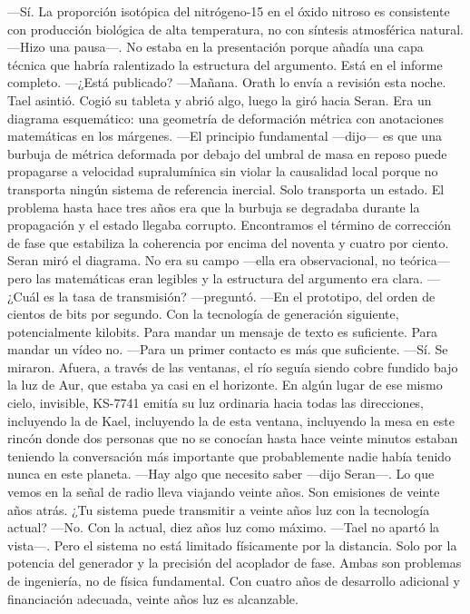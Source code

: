 \documentclass[11pt,a5paper,twoside]{book}
\begin{document}
—Sí. La proporción isotópica del nitrógeno-15 en el óxido nitroso es consistente con producción biológica de alta temperatura, no con síntesis atmosférica natural. —Hizo una pausa—. No estaba en la presentación porque añadía una capa técnica que habría ralentizado la estructura del argumento. Está en el informe completo.
—¿Está publicado?
—Mañana. Orath lo envía a revisión esta noche.
Tael asintió. Cogió su tableta y abrió algo, luego la giró hacia Seran. Era un diagrama esquemático: una geometría de deformación métrica con anotaciones matemáticas en los márgenes.
—El principio fundamental —dijo— es que una burbuja de métrica deformada por debajo del umbral de masa en reposo puede propagarse a velocidad supralumínica sin violar la causalidad local porque no transporta ningún sistema de referencia inercial. Solo transporta un estado. El problema hasta hace tres años era que la burbuja se degradaba durante la propagación y el estado llegaba corrupto. Encontramos el término de corrección de fase que estabiliza la coherencia por encima del noventa y cuatro por ciento.
Seran miró el diagrama. No era su campo —ella era observacional, no teórica— pero las matemáticas eran legibles y la estructura del argumento era clara.
—¿Cuál es la tasa de transmisión? —preguntó.
—En el prototipo, del orden de cientos de bits por segundo. Con la tecnología de generación siguiente, potencialmente kilobits. Para mandar un mensaje de texto es suficiente. Para mandar un vídeo no.
—Para un primer contacto es más que suficiente.
—Sí.
Se miraron.
Afuera, a través de las ventanas, el río seguía siendo cobre fundido bajo la luz de Aur, que estaba ya casi en el horizonte. En algún lugar de ese mismo cielo, invisible, KS-7741 emitía su luz ordinaria hacia todas las direcciones, incluyendo la de Kael, incluyendo la de esta ventana, incluyendo la mesa en este rincón donde dos personas que no se conocían hasta hace veinte minutos estaban teniendo la conversación más importante que probablemente nadie había tenido nunca en este planeta.
—Hay algo que necesito saber —dijo Seran—. Lo que vemos en la señal de radio lleva viajando veinte años. Son emisiones de veinte años atrás. ¿Tu sistema puede transmitir a veinte años luz con la tecnología actual?
—No. Con la actual, diez años luz como máximo. —Tael no apartó la vista—. Pero el sistema no está limitado físicamente por la distancia. Solo por la potencia del generador y la precisión del acoplador de fase. Ambas son problemas de ingeniería, no de física fundamental. Con cuatro años de desarrollo adicional y financiación adecuada, veinte años luz es alcanzable.
\end{document}
